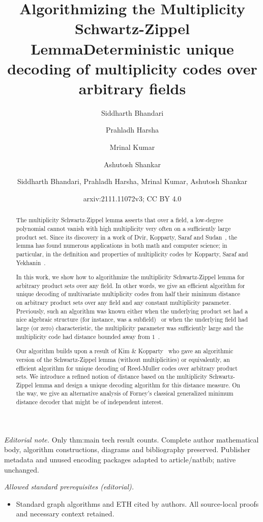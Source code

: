 \documentclass{article}
\author{Siddharth Bhandari \and Prahladh Harsha \and Mrinal Kumar \and Ashutosh Shankar}\date{}
\title{Algorithmizing the Multiplicity Schwartz-Zippel Lemma}
\title{Deterministic unique decoding of multiplicity codes over arbitrary fields}
\author{Siddharth Bhandari, Prahladh Harsha, Mrinal Kumar, Ashutosh Shankar}
\date{arxiv:2111.11072v3; CC BY 4.0}
\begin{document}
\maketitle
\noindent\textit{Editorial note.} Only thm:main tech result counts. Complete author mathematical body, algorithm constructions, diagrams and bibliography preserved. Publisher metadata and unused encoding packages adapted to article/natbib; native unchanged.\par\medskip
\noindent\textit{Allowed standard prerequisites (editorial).}\begin{itemize}
\item Standard graph algorithms and ETH cited by authors. All source-local proofs and necessary context retained.
\end{itemize}\medskip
	\maketitle
	
	\begin{abstract}
		The multiplicity Schwartz-Zippel lemma asserts that over a field, a
		low-degree polynomial cannot vanish with high multiplicity very
		often on a sufficiently large product set. Since its discovery in a
		work of Dvir, Kopparty, Saraf and Sudan~\cite{DvirKSS2013}, the
		lemma has found numerous applications in both math and computer
		science; in particular, in the definition and properties of
		multiplicity codes by Kopparty, Saraf and Yekhanin~\cite{KoppartySY2014}.
		
		In this work, we show how to algorithmize the multiplicity
		Schwartz-Zippel lemma for arbitrary product sets over any field. In
		other words, we give an efficient algorithm for unique decoding of
		multivariate multiplicity codes from half their minimum distance on
		arbitrary product sets over any field and any constant multiplicity parameter. Previously, such an
		algorithm was known either when the underlying product set had a nice
		algebraic structure (for instance, was a subfield)~\cite{Kopparty2015} or when the underlying field had large (or zero)
		characteristic, the multiplicity parameter was sufficiently large
		and the multiplicity code had distance bounded away from $1$~\cite{BhandariHKS2021-mgrid}. 
		
		Our algorithm builds upon a result of Kim \& Kopparty~\cite{KimK2017} who gave an algorithmic version of the
		Schwartz-Zippel lemma (without multiplicities) or equivalently, an
		efficient algorithm for unique decoding of Reed-Muller codes over
		arbitrary product sets. We introduce a refined notion of distance based on the multiplicity Schwartz-Zippel lemma and design a unique decoding algorithm
		for this distance measure. On the way, we give an alternative analysis of
		Forney's classical generalized minimum distance decoder that might
		be of independent interest.
		
	\end{abstract}
	
\end{document}
